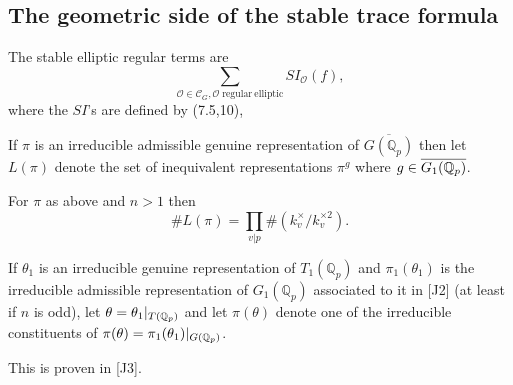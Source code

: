 \subsection{The geometric side of the stable trace formula}

The stable elliptic regular terms are 
\begin{equation}
\sum_{ {\mathcal{O}}\in {\mathcal{C}}_G ,
\mathcal{O}\;\mathrm{regular\ elliptic} }
SI_{\mathcal{O}}(f),
\end{equation}
where the $SI$'s are defined by (7.5,10), 

\begin{definition} If $\pi$ is an irreducible admissible
genuine representation of
$\overline{G({\mathbb Q}_p)}$ then let
$L(\pi)$ denote the set of inequivalent representations
$\pi^g$ where $g\in \overline{G_1(\mathbb{Q} _p)}$.
\end{definition}

\begin{remark} For $\pi$ as above and $n>1$ then
\[
\# L(\pi)=
\prod_{v|p}\#( k_v^\times/k_v^{\times 2}).
\]
\end{remark}

\begin{lemma} If $\theta_1$ is an irreducible genuine representation
of ${T_1({\mathbb Q}_p)}$ and $\pi_1(\theta_1)$ is the
irreducible admissible representation of
${G_1({\mathbb Q}_p)}$ associated to it in [J2]
(at least if $n$ is odd), let
$\theta =\theta_1|_{{T(\mathbb{Q} _p)}}$ and let
$\pi(\theta)$ denote one of the irreducible
constituents of
$\pi(\theta) =\pi_1(\theta_1)|_{G(\mathbb{Q} _p)}$.
\end{lemma}

This is proven in [J3].

